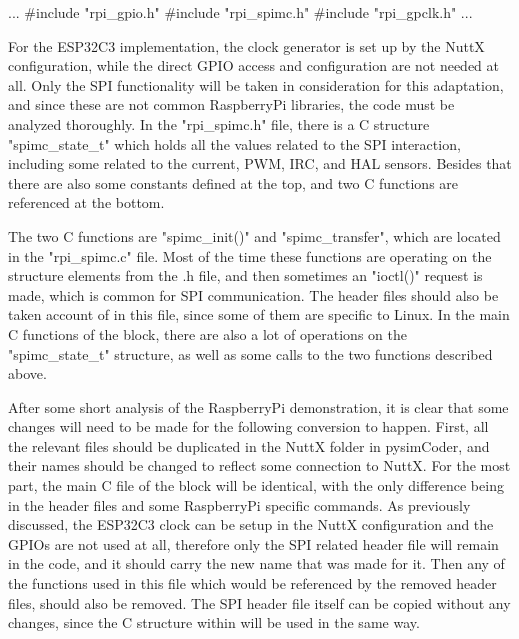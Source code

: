\begtt
...
#include "rpi_gpio.h"
#include "rpi_spimc.h"
#include "rpi_gpclk.h"
...
\endtt

\quad For the ESP32C3 implementation, the clock generator is set up by the NuttX configuration, while the direct
GPIO access and configuration are not needed at all. Only the SPI functionality will be taken in consideration for
this adaptation, and since these are not common RaspberryPi libraries, the code must be analyzed thoroughly. In the
"rpi_spimc.h" file, there is a C structure "spimc_state_t" which holds all the values related to the SPI
interaction, including some related to the current, PWM, IRC, and HAL sensors. Besides that there are also
some constants defined at the top, and two C functions are referenced at the bottom. 

\quad The two C functions are "spimc_init()" and "spimc_transfer", which are located in the "rpi_spimc.c" file.
Most of the time these functions are operating on the structure elements from the .h file, and then sometimes
an "ioctl()" request is made, which is common for SPI communication. The header files should also be taken
account of in this file, since some of them are specific to Linux. In the main C functions of the block, there
are also a lot of operations on the "spimc_state_t" structure, as well as some calls to the two functions
described above. 

\quad After some short analysis of the RaspberryPi demonstration, it is clear that some changes will need to
be made for the following conversion to happen. First, all the relevant files should be duplicated in the NuttX
folder in pysimCoder, and their names should be changed to reflect some connection to NuttX. For the most part,
the main C file of the block will be identical, with the only difference being in the header files and some
RaspberryPi specific commands. As previously discussed, the ESP32C3 clock can be setup in the NuttX
configuration and the GPIOs are not used at all, therefore only the SPI related header file will remain in the
code, and it should carry the new name that was made for it. Then any of the functions used in this file which
would be referenced by the removed header files, should also be removed. The SPI header file itself can be copied
without any changes, since the C structure within will be used in the same way.

